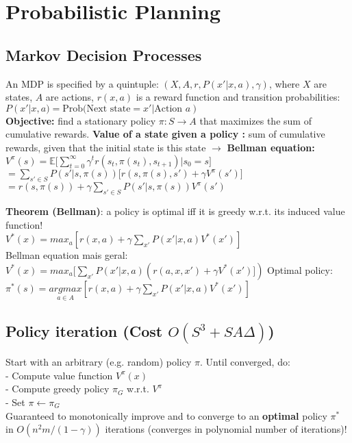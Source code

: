 \section{Probabilistic Planning}
\subsection{Markov Decision Processes}
An MDP is specified by a quintuple: $(X, A, r, P(x'|x, a), \gamma)$, where $X$ are states, $A$ are actions, $r(x,a)$ is a reward function and transition probabilities:\\
    $P(x'|x,a)=\text{Prob(Next state}=x'|\text{Action } a)$\\ 
\textbf{Objective:} find a stationary policy $\pi: S \rightarrow A$ that maximizes the sum of cumulative rewards.
\textbf{Value of a state given a policy :} sum of cumulative rewards, given that the initial state is this state $\rightarrow$ \textbf{Bellman equation:}\\
$V^\pi(s)=\mathbb{E}\Big[ \sum_{t=0}^\infty \gamma^tr(s_t, \pi(s_t), s_{t+1})|s_0=s\Big]$\\
$= \sum_{s'\in S}P(s'|s, \pi(s))\big[r(s, \pi(s),s')+\gamma V^\pi(s')\big]$\\
$= r(s, \pi(s))+\gamma\sum_{s'\in S}P(s'|s,\pi(s))V^\pi(s')$

\textbf{Theorem (Bellman)}: a policy is optimal iff it is greedy w.r.t. its induced value function!\\
$V^*(x)=max_a[r(x,a)+\gamma \sum_{x'}P(x'|x,a)V^*(x')]$\\
Bellman equation mais geral: \\
$V^*(x)=max_a[ \sum_{x'}P(x'|x,a)(r(a, x, x')+\gamma V^*(x')])$
Optimal policy: \\
$\pi^*(s)=\underset{a\in A}{argmax} [r(x,a)+\gamma \sum_{x'}P(x'|x,a)V^*(x')]$

\subsection{Policy iteration (Cost $O(S^3+SA\Delta)$)}
Start with an arbitrary (e.g. random) policy $\pi$.
Until converged, do:\\
- Compute value function $V^\pi (x)$\\
- Compute greedy policy $\pi_G$ w.r.t. $V^\pi$\\
- Set $\pi \leftarrow \pi_G$\\
Guaranteed to monotonically improve and to converge to an \textbf{optimal} policy $\pi^*$ in $O(n^2m/(1-\gamma))$ iterations (converges in polynomial number of iterations)!

